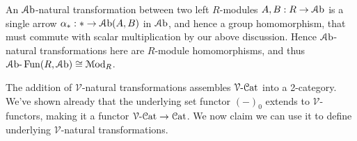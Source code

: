 \begin{example}
	An $\mathcal{A}\mathrm{b}$-natural transformation between two left $R$-modules $A,B : R \to \mathcal{A}\mathrm{b}$ is a single arrow $\alpha_* : * \to \mathcal{A}\mathrm{b}(A,B)$ in $\mathcal{A}\mathrm{b}$, and hence a group homomorphism, that must commute with scalar multiplication by our above discussion. Hence $\mathcal{A}\mathrm{b}$-natural transformations here are $R$-module homomorphisms, and thus $\mathcal{A}\mathrm{b}\text{-} \operatorname{Fun}(R,\mathcal{A}\mathrm{b})\cong\mathcal{M}\mathrm{od}_R$.
\end{example}

The addition of $\mathcal{V} $-natural transformations assembles $\mathcal{V} \text{-} \mathcal{C}\mathrm{at} $ into a 2-category. We've shown already that the underlying set functor $(-)_0$ extends to $\mathcal{V} $-functors, making it a functor $\mathcal{V} \text{-} \mathcal{C}\mathrm{at} \to \mathcal{C}\mathrm{at} $. We now claim we can use it to define underlying $\mathcal{V} $-natural transformations.


